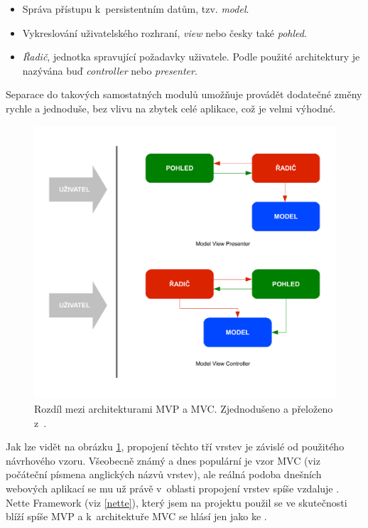 \begin{itemize}
	\item Správa přístupu k~persistentním datům, tzv. {\it model}. 
	\item Vykreslování uživatelského rozhraní, {\it view} nebo česky
	také {\it pohled}.
	\item {\it Řadič}, jednotka spravující požadavky uživatele. Podle
	použité architektury je nazývána buď {\it controller} nebo {\it presenter}.
\end{itemize}

Separace do takových samostatných modulů umožňuje provádět dodatečné
změny rychle a jednoduše, bez vlivu na zbytek celé aplikace, což je
velmi výhodné.

\begin{figure}[h]
	\includegraphics[width=\textwidth, keepaspectratio]{fig/mvp-mvc}
	\caption{Rozdíl mezi architekturami MVP a MVC. Zjednodušeno a
	přeloženo z~\cite{mvpNette}.}
	\label{obrMvpMvc}
\end{figure}

Jak lze vidět na obrázku \ref{obrMvpMvc}, propojení těchto tří vrstev je závislé
od použitého návrhového vzoru. Všeobecně známý a dnes populární je
vzor MVC (viz počáteční písmena anglických názvů vrstev), ale reálná
podoba dnešních webových aplikací se mu už právě v~oblasti propojení
vrstev spíše vzdaluje \cite{mvc}. Nette Framework (viz \ref{nette}),
který jsem na projektu použil se ve skutečnosti blíží spíše MVP \cite{mvp} a
k~architektuře MVC se hlásí jen jako ke  \cite{mvpNette}.

